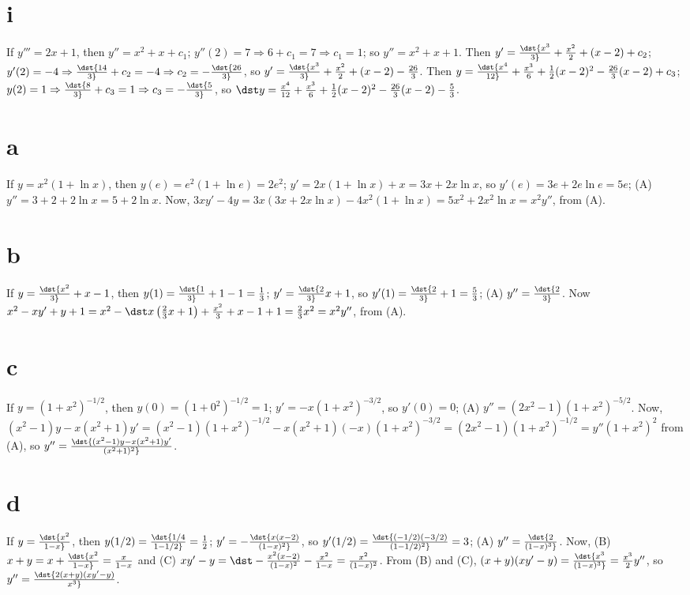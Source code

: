 \documentclass[dvips]{book}
\renewcommand{\exer}[1]{\par\medskip\;\noindent{\color{red}\bf #1.}}
\numberwithin{example}{section}
\numberwithin{equation}{section}
\numberwithin{theorem}{section}
\numberwithin{table}{section}
\numberwithin{figure}{section}
\begin{document}
\part{i} If $y'''=2x+1$, then $y''=x^2+x+c_1$; $y''(2)=7\Rightarrow
6+c_1=7\Rightarrow c_1=1$; so $y''=x^2+x+1$. Then $y'=\dst{x^3\over
3}+{x^2\over 2}+(x-2)+c_2$; $y'(2)=-4\Rightarrow \dst{14\over
3}+c_2=-4\Rightarrow c_2=-\dst{26\over 3}$, so $y'=\dst{x^3\over
3}+{x^2\over 2}+(x-2)-{26\over 3}$. Then $y=\dst{x^4\over
12}+{x^3\over 6}+{1\over 2}(x-2)^2-{26\over 3}(x-2)+c_3$;
$y(2)=1\Rightarrow \dst{8\over 3}+c_3=1\Rightarrow c_3=-\dst{5\over
3}$, so $\dst y={x^4\over 12}+{x^3\over6}+{1\over2} (x-2)^2-{26\over3}
(x-2)-{5\over3}$.


\exer{1.2.6}
\part{a} If $y=x^2(1+\ln x)$, then $y(e)=e^2(1+\ln e)=2e^2$;
$y'=2x(1+\ln x)+x=3x+2x\ln x$, so $y'(e)=3e+2e\ln e=5e$; (A)
$y''=3+2+2\ln x=5+2\ln x$. Now, $3xy'-4y=3x(3x+2x\ln x)-4x^2(1+\ln
x)=5x^2+2x^2\ln x=x^2y''$, from (A).

\part{b} If $y=\dst{x^2\over3}+x-1$, then $y(1)=\dst{1\over
3}+1-1={1\over 3}$; $y'=\dst{2\over 3}x+1$, so $y'(1)=\dst{2\over
3}+1={5\over 3}$; (A) $y''=\dst{2\over 3}$. Now
$x^2-xy'+y+1=x^2-\dst x\left({2\over 3}x+1\right)+{x^2\over
3}+x-1+1={2\over 3}x^2=x^2y''$, from (A).

\part{c} If $y=(1+x^2)^{-1/2}$, then $y(0)=(1+0^2)^{-1/2}=1$;
$y'=-x(1+x^2)^{-3/2}$, so $y'(0)=0$; (A) $y''=(2x^2-1)(1+x^2)^{-5/2}$.
Now,
$(x^2-1)y-x(x^2+1)y'=(x^2-1)(1+x^2)^{-1/2}-x(x^2+1)(-x)(1+x^2)^{-3/2}
=(2x^2-1)(1+x^2)^{-1/2}=y''(1+x^2)^2$ from (A), so
$y''=\dst{(x^2-1)y-x(x^2+1)y'\over (x^2+1)^2}$.

\part{d} If $y=\dst{x^2\over 1-x}$, then $y(1/2)=\dst{1/4\over
1-1/2}={1\over 2}$; $y'=-\dst{x(x-2)\over(1-x)^2}$, so
$y'(1/2)=\dst{(-1/2)(-3/2)\over(1-1/2)^2}=3$; (A) $y''=\dst{2\over
(1-x)^3}$. Now, (B) $x+y=x+\dst{x^2\over1-x}={x\over1-x}$ and (C)
$xy'-y=\dst-{x^2(x-2)\over(1-x)^2}-{x^2\over1-x}={x^2\over(1-x)^2}$.
From (B) and (C), $(x+y)(xy'-y)=\dst{x^3\over(1-x)^3}={x^3\over2}y''$,
so $y''=\dst{2(x+y)(xy'-y)\over x^3}$.
\end{document}
